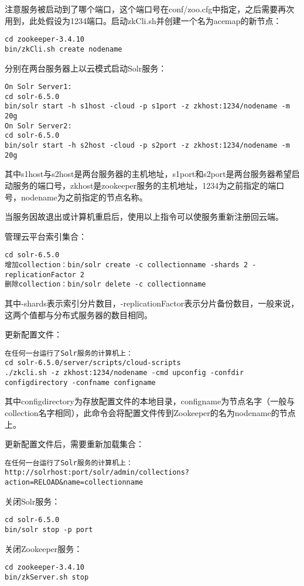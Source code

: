 注意服务被启动到了哪个端口，这个端口号在conf/zoo.cfg中指定，之后需要再次用到，此处假设为1234端口。启动zkCli.sh并创建一个名为acemap的新节点：
\begin{lstlisting}[basicstyle=\small\ttfamily, numbers=none]
cd zookeeper-3.4.10
bin/zkCli.sh create nodename
\end{lstlisting}

分别在两台服务器上以云模式启动Solr服务：
\begin{lstlisting}[basicstyle=\small\ttfamily, numbers=none]
On Solr Server1:
cd solr-6.5.0
bin/solr start -h s1host -cloud -p s1port -z zkhost:1234/nodename -m 20g
On Solr Server2:
cd solr-6.5.0
bin/solr start -h s2host -cloud -p s2port -z zkhost:1234/nodename -m 20g
\end{lstlisting}

其中s1host与s2host是两台服务器的主机地址，s1port和s2port是两台服务器希望启动服务的端口号，zkhost是zookeeper服务的主机地址，1234为之前指定的端口号，nodename为之前指定的节点名称。

当服务因故退出或计算机重启后，使用以上指令可以使服务重新注册回云端。

管理云平台索引集合：
\begin{lstlisting}[basicstyle=\small\ttfamily, numbers=none]
cd solr-6.5.0
增加collection：bin/solr create -c collectionname -shards 2 -replicationFactor 2
删除collection：bin/solr delete -c collectionname
\end{lstlisting}

其中-shards表示索引分片数目，-replicationFactor表示分片备份数目，一般来说，这两个值都与分布式服务器的数目相同。

更新配置文件：
\begin{lstlisting}[basicstyle=\small\ttfamily, numbers=none]
在任何一台运行了Solr服务的计算机上：
cd solr-6.5.0/server/scripts/cloud-scripts
./zkcli.sh -z zkhost:1234/nodename -cmd upconfig -confdir configdirectory -confname configname
\end{lstlisting}

其中configdirectory为存放配置文件的本地目录，configname为节点名字（一般与collection名字相同），此命令会将配置文件传到Zookeeper的名为nodename的节点上。

更新配置文件后，需要重新加载集合：
\begin{lstlisting}[basicstyle=\small\ttfamily, numbers=none]
在任何一台运行了Solr服务的计算机上：
http://solrhost:port/solr/admin/collections?action=RELOAD&name=collectionname
\end{lstlisting}

关闭Solr服务：
\begin{lstlisting}[basicstyle=\small\ttfamily, numbers=none]
cd solr-6.5.0
bin/solr stop -p port
\end{lstlisting}

关闭Zookeeper服务：
\begin{lstlisting}[basicstyle=\small\ttfamily, numbers=none]
cd zookeeper-3.4.10
bin/zkServer.sh stop
\end{lstlisting}